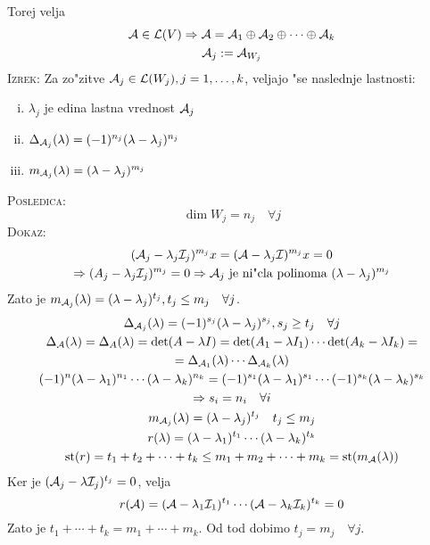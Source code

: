 Torej velja
\begin{gather*}
\mathcal{A} \in \mathcal{L}(V) \Rightarrow \mathcal{A} = \mathcal{A}_1 \oplus \mathcal{A}_2 \oplus \cdots \oplus \mathcal{A}_k \\
\mathcal{A}_j := \mathcal{A}_{W_j}
\end{gather*}
\textsc{Izrek:} Za zo"zitve $\mathcal{A}_j \in \mathcal{L}(W_j), j = 1, \ldots, k$, veljajo "se naslednje lastnosti:
\begin{enumerate}[(i)]
	\item $\lambda_j$ je edina lastna vrednost $\mathcal{A}_j$
	\item $\Delta_{\mathcal{A}_j} (\lambda) = (-1)^{n_j} (\lambda - \lambda_j)^{n_j}$
	\item $m_{\mathcal{A}_j} (\lambda) = (\lambda - \lambda_j)^{m_j}$
\end{enumerate}
\textsc{Posledica:}
\begin{equation*}
\dim W_j = n_j \quad \forall j
\end{equation*}
\textsc{Dokaz:}
\begin{gather*}
(\mathcal{A}_j - \lambda_j \mathcal{I}_j)^{m_j} x = (\mathcal{A} - \lambda_j \mathcal{I})^{m_j} x = 0 \\
\Rightarrow (A_j - \lambda_j \mathcal{I}_j)^{m_j} = 0 \Rightarrow \text{$\mathcal{A}_j$ je ni"cla polinoma $(\lambda - \lambda_j)^{m_j}$}
\end{gather*}
Zato je $m_{\mathcal{A}_j}(\lambda) = (\lambda - \lambda_j)^{t_j}, t_j \leq m_j \quad \forall j$.
\begin{gather*}
\Delta_{\mathcal{A}_j}(\lambda) = (-1)^{s_j} (\lambda - \lambda_j)^{s_j}, s_j \geq t_j \quad \forall j \\
\Delta_{\mathcal{A}}(\lambda) = \Delta_A (\lambda) = \det(A - \lambda I) = \det(A_1 - \lambda I_1) \cdots \det (A_k - \lambda I_k) = \\
= \Delta_{\mathcal{A}_1}(\lambda) \cdots \Delta_{\mathcal{A}_k} (\lambda) \\
(-1)^n (\lambda - \lambda_1)^{n_1} \cdots (\lambda - \lambda_k)^{n_k} = (-1)^{s_1} (\lambda - \lambda_1)^{s_1} \cdots (-1)^{s_k} (\lambda - \lambda_k)^{s_k} \\
\Rightarrow s_i = n_i \quad \forall i \\
m_{\mathcal{A}_j} (\lambda) = (\lambda - \lambda_j)^{t_j} \quad t_j \leq m_j \\
r(\lambda) = (\lambda - \lambda_1)^{t_1} \cdots (\lambda - \lambda_k)^{t_k} \\
\operatorname{st} (r) = t_1 + t_2 + \cdots + t_k \leq m_1 + m_2 + \cdots + m_k = \operatorname{st} (m_{\mathcal{A}} (\lambda))
\end{gather*}
Ker je $(\mathcal{A}_j - \lambda \mathcal{I}_j)^{t_j} = 0$, velja 
\begin{equation*}
r(\mathcal{A}) = (\mathcal{A} - \lambda_1 \mathcal{I}_1)^{t_1}\cdots (\mathcal{A} - \lambda_k \mathcal{I}_k)^{t_k} = 0
\end{equation*}
Zato je $t_1 + \cdots + t_k = m_1 + \cdots + m_k$. Od tod dobimo $t_j = m_j \quad \forall j$.

